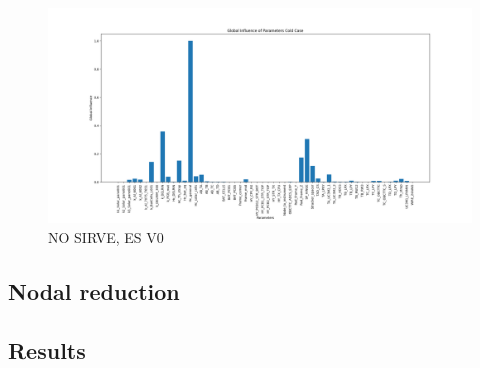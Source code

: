 \begin{figure}[H]
	\centering
	\includegraphics[width=\textwidth]{Figures/figs_malas/infGlobalCold.png}
	\caption{NO SIRVE, ES V0}
	\label{fig:fm4}
\end{figure}
\subsection{Nodal reduction}
\subsection{Results}









